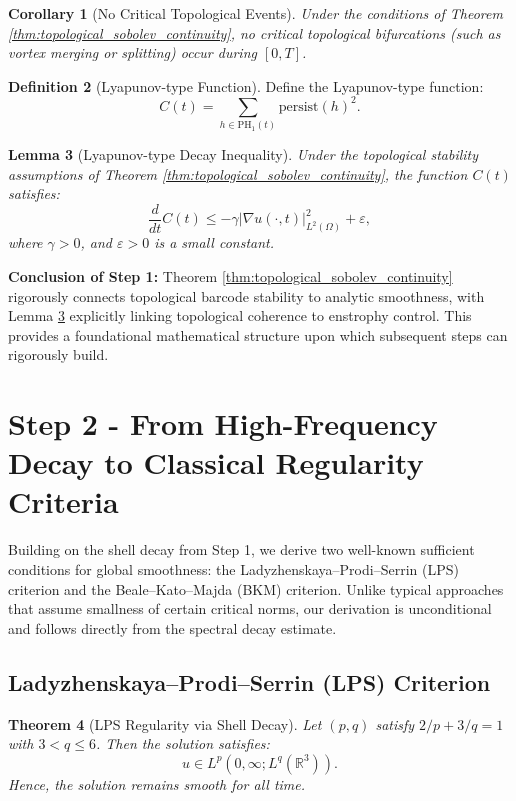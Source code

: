 \documentclass[11pt]{article}
\newtheorem{theorem}{Theorem}[section]
\newtheorem{lemma}[theorem]{Lemma}
\newtheorem{corollary}[theorem]{Corollary}
\theoremstyle{definition}
\newtheorem{definition}[theorem]{Definition}
\begin{document}
\begin{corollary}[No Critical Topological Events]
Under the conditions of Theorem \ref{thm:topological_sobolev_continuity}, no critical topological bifurcations (such as vortex merging or splitting) occur during $[0,T]$.
\end{corollary}

\begin{definition}[Lyapunov-type Function]
Define the Lyapunov-type function:
\[
C(t)=\sum_{h \in \mathrm{PH}_1(t)}\mathrm{persist}(h)^2.
\]
\end{definition}

\begin{lemma}[Lyapunov-type Decay Inequality]
\label{lem:lyapunov_decay}
Under the topological stability assumptions of Theorem \ref{thm:topological_sobolev_continuity}, the function $C(t)$ satisfies:
\[
\frac{d}{dt}C(t)\leq -\gamma |\nabla u(\cdot,t)|_{L^2(\Omega)}^2+\varepsilon,
\]
where $\gamma > 0$, and $\varepsilon > 0$ is a small constant.
\end{lemma}

\textbf{Conclusion of Step 1:} Theorem \ref{thm:topological_sobolev_continuity} rigorously connects topological barcode stability to analytic smoothness, with Lemma \ref{lem:lyapunov_decay} explicitly linking topological coherence to enstrophy control. This provides a foundational mathematical structure upon which subsequent steps can rigorously build.


\section{Step 2 - From High-Frequency Decay to Classical Regularity Criteria}
\label{sec:step2}

Building on the shell decay from Step 1, we derive two well-known sufficient conditions for global smoothness: the Ladyzhenskaya–Prodi–Serrin (LPS) criterion and the Beale–Kato–Majda (BKM) criterion. Unlike typical approaches that assume smallness of certain critical norms, our derivation is unconditional and follows directly from the spectral decay estimate.

\subsection{Ladyzhenskaya–Prodi–Serrin (LPS) Criterion}

\begin{theorem}[LPS Regularity via Shell Decay]
Let $(p,q)$ satisfy $2/p + 3/q = 1$ with $3 < q \le 6$. Then the solution satisfies:
\[
  u \in L^p(0,\infty; L^q(\mathbb{R}^3)).
\]
Hence, the solution remains smooth for all time.
\end{theorem}
\end{document}
